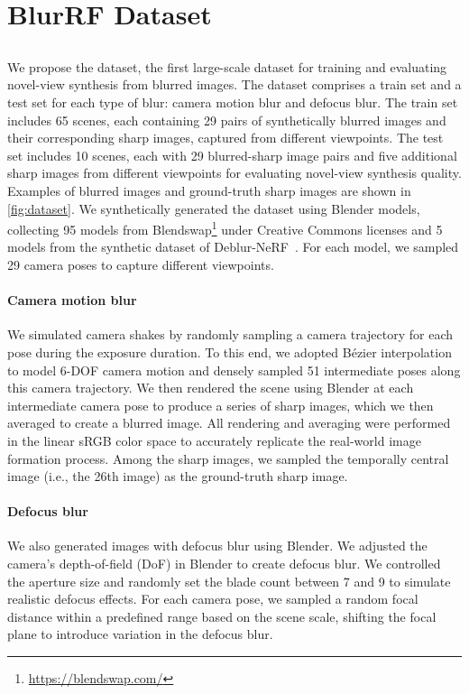 \section{BlurRF Dataset}
\label{sec:dataset}

\subsection{\SynthDataName{}}
We propose the \SynthDataName{} dataset, the first large-scale dataset for training and evaluating novel-view synthesis from blurred images.
The dataset comprises a train set and a test set for each type of blur: camera motion blur and defocus blur.
The train set includes 65 scenes, each containing 29 pairs of synthetically blurred images and their corresponding sharp images, captured from different viewpoints. 
The test set includes 10 scenes, each with 29 blurred-sharp image pairs and five additional sharp images from different viewpoints for evaluating novel-view synthesis quality.
Examples of blurred images and ground-truth sharp images are shown in \cref{fig:dataset}.
We synthetically generated the dataset using Blender models, collecting 95 models from Blendswap\footnote{\url{https://blendswap.com/}} under Creative Commons licenses and 5 models from the synthetic dataset of Deblur-NeRF~\cite{ma2022deblurnerf}.
For each model, we sampled 29 camera poses to capture different viewpoints.

\paragraph{Camera motion blur}
We simulated camera shakes by randomly sampling a camera trajectory for each pose during the exposure duration. 
To this end, we adopted B\'ezier interpolation to model 6-DOF camera motion and densely sampled 51 intermediate poses along this camera trajectory.
We then rendered the scene using Blender at each intermediate camera pose to produce a series of sharp images, which we then averaged to create a blurred image.
All rendering and averaging were performed in the linear sRGB color space to accurately replicate the real-world image formation process. 
Among the sharp images, we sampled the temporally central image (i.e., the 26th image) as the ground-truth sharp image.  

\paragraph{Defocus blur}
We also generated images with defocus blur using Blender.
We adjusted the camera’s depth-of-field (DoF) in Blender to create defocus blur.
We controlled the aperture size and randomly set the blade count between 7 and 9 to simulate realistic defocus effects.
For each camera pose, we sampled a random focal distance within a predefined range based on the scene scale, shifting the focal plane to introduce variation in the defocus blur.

